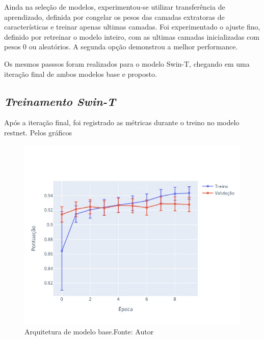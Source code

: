 Ainda na seleção de modelos, experimentou-se utilizar transferência de aprendizado, definida por congelar os pesos das camadas extratoras de características e treinar apenas ultimas camadas. Foi experimentado o ajuste fino, definido por retreinar o modelo inteiro, com as ultimas camadas inicializadas com pesos 0 ou aleatórios. A segunda opção demonstrou a melhor performance.


Os mesmos passsos foram realizados para o modelo Swin-T, chegando em uma iteração final de ambos modelos base e proposto.

\subsection{\textit{Treinamento Swin-T}}\label{sec:Cap3_TrainResnet}
Após a iteração final, foi registrado as métricas durante o treino no modelo restnet. Pelos gráficos 



\begin{figure}[!ht]
    \centering
    \includegraphics[width=\columnwidth]{Imagens/results/rsp-resnet-50_planet_pt/pontuação em treino e validação por época.jpg}
    \caption{ Arquitetura de modelo base.Fonte: Autor}
    \label{fig:TreinoResnetScore}
\end{figure}  

